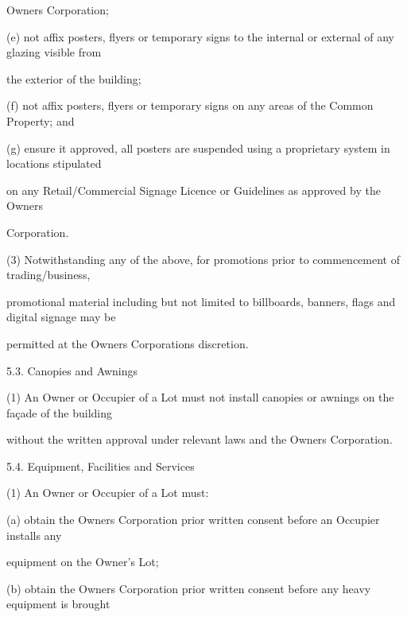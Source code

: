 \documentclass{article}
\begin{document}
{\fontsize{10.02}{1}Owners Corporation; }

{\fontsize{9.962}{1}(e) not affix posters, flyers or temporary signs to the internal or external of any glazing visible from }

{\fontsize{10.02}{1}the exterior of the building; }

{\fontsize{9.962}{1}(f) not affix posters, flyers or temporary signs on any areas of the Common Property; and }

{\fontsize{9.962}{1}(g) ensure it approved, all posters are suspended using a proprietary system in locations stipulated }

{\fontsize{10.02}{1}on any Retail/Commercial Signage Licence or Guidelines as approved by the Owners }

{\fontsize{10.02}{1}Corporation. }

{\fontsize{9.962}{1}(3) Notwithstanding any of the above, for promotions prior to commencement of trading/business, }

{\fontsize{10.02}{1}promotional material including but not limited to billboards, banners, flags and digital signage may be }

{\fontsize{10.02}{1}permitted at the Owners Corporations discretion. }

\newpage


















{\fontsize{9.99}{1}5.3. Canopies and Awnings }

{\fontsize{9.962}{1}(1) An Owner or Occupier of a Lot must not install canopies or awnings on the façade of the building }

{\fontsize{10.02}{1}without the written approval under relevant laws and the Owners Corporation. }

{\fontsize{9.99}{1}5.4. Equipment, Facilities and Services }

{\fontsize{9.962}{1}(1) An Owner or Occupier of a Lot must: }

{\fontsize{9.962}{1}(a) obtain the Owners Corporation prior written consent before an Occupier installs any }

{\fontsize{10.02}{1}equipment on the Owner’s Lot; }

{\fontsize{9.962}{1}(b) obtain the Owners Corporation prior written consent before any heavy equipment is brought }
\end{document}
